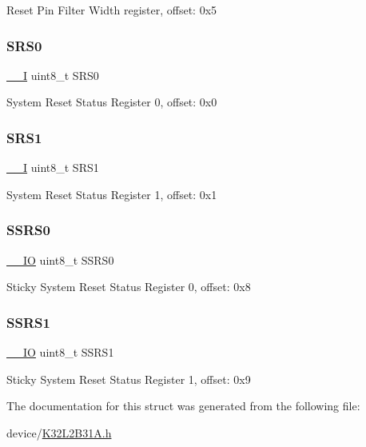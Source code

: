Reset Pin Filter Width register, offset\+: 0x5 \mbox{\label{struct_r_c_m___type_a41d4e6ae9fb47445146929d15e97153f}} 
\subsubsection{\texorpdfstring{SRS0}{SRS0}}
{\footnotesize\ttfamily \mbox{\hyperlink{core__cm0plus_8h_af63697ed9952cc71e1225efe205f6cd3}{\+\_\+\+\_\+I}} uint8\+\_\+t S\+R\+S0}

System Reset Status Register 0, offset\+: 0x0 \mbox{\label{struct_r_c_m___type_a2164524ec77565baad264a25fbc65378}} 
\subsubsection{\texorpdfstring{SRS1}{SRS1}}
{\footnotesize\ttfamily \mbox{\hyperlink{core__cm0plus_8h_af63697ed9952cc71e1225efe205f6cd3}{\+\_\+\+\_\+I}} uint8\+\_\+t S\+R\+S1}

System Reset Status Register 1, offset\+: 0x1 \mbox{\label{struct_r_c_m___type_a15733121a3927d30210bdcdf90f2d296}} 
\subsubsection{\texorpdfstring{SSRS0}{SSRS0}}
{\footnotesize\ttfamily \mbox{\hyperlink{core__cm0plus_8h_aec43007d9998a0a0e01faede4133d6be}{\+\_\+\+\_\+\+IO}} uint8\+\_\+t S\+S\+R\+S0}

Sticky System Reset Status Register 0, offset\+: 0x8 \mbox{\label{struct_r_c_m___type_a7b2815c39ff2f860d979b2aa9f18d773}} 
\subsubsection{\texorpdfstring{SSRS1}{SSRS1}}
{\footnotesize\ttfamily \mbox{\hyperlink{core__cm0plus_8h_aec43007d9998a0a0e01faede4133d6be}{\+\_\+\+\_\+\+IO}} uint8\+\_\+t S\+S\+R\+S1}

Sticky System Reset Status Register 1, offset\+: 0x9 

The documentation for this struct was generated from the following file\+:\begin{DoxyCompactItemize}
\item 
device/\mbox{\hyperlink{_k32_l2_b31_a_8h}{K32\+L2\+B31\+A.\+h}}\end{DoxyCompactItemize}
